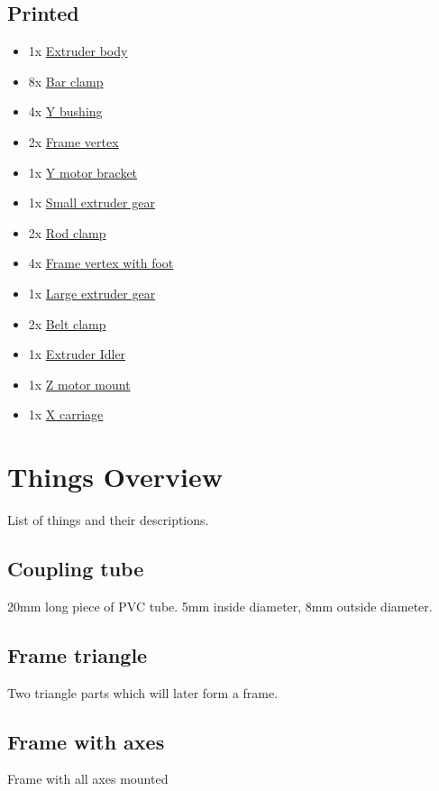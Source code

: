 \documentclass[11pt]{article}
\begin{document}
\subsection{Printed}
\begin{itemize}
\item 1x \hyperlink{thing_extruder-body}{Extruder body}
\item 8x \hyperlink{thing_bar-clamp}{Bar clamp}
\item 4x \hyperlink{thing_y-bushing}{Y bushing}
\item 2x \hyperlink{thing_frame-vertex}{Frame vertex}
\item 1x \hyperlink{thing_y-motor-bracket}{Y motor bracket}
\item 1x \hyperlink{thing_small-gear}{Small extruder gear}
\item 2x \hyperlink{thing_rod-clamp}{Rod clamp}
\item 4x \hyperlink{thing_frame-vertex-foot}{Frame vertex with foot}
\item 1x \hyperlink{thing_large-gear}{Large extruder gear}
\item 2x \hyperlink{thing_belt-clamp}{Belt clamp}
\item 1x \hyperlink{thing_idler}{Extruder Idler}
\item 1x \hyperlink{thing_z-motor-mount}{Z motor mount}
\item 1x \hyperlink{thing_x-carriage}{X carriage}
\end{itemize}

\newpage

\section{Things Overview}
List of things and their descriptions.

\hypertarget{thing_coupling-tube}{\subsection{Coupling tube}}
20mm long piece of PVC tube. 5mm inside diameter, 8mm outside diameter.

\hypertarget{thing_frame-triangle}{\subsection{Frame triangle}}
Two triangle parts which will later form a frame.

\hypertarget{thing_frame-with-axes}{\subsection{Frame with axes}}
Frame with all axes mounted
\end{document}
